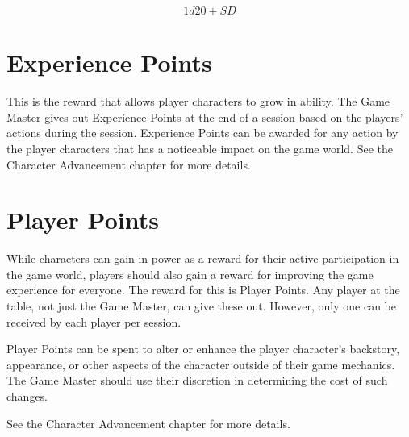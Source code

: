 \begin{multicols}{2}
$$1d20 + SD$$

\section{Experience Points}

This is the reward that allows player characters to grow in ability. The Game Master gives
out Experience Points at the end of a session based on the players' actions during the
session. Experience Points can be awarded for any action by the player characters that
has a noticeable impact on the game world. See the Character Advancement chapter for
more details.

\section{Player Points}

While characters can gain in power as a reward for their active participation in the game
world, players should also gain a reward for improving the game experience for everyone.
The reward for this is Player Points. Any player at the table, not just the Game Master,
can give these out. However, only one can be received by each player per session.

Player Points can be spent to alter or enhance the player character's backstory, appearance,
or other aspects of the character outside of their game mechanics. The Game Master should
use their discretion in determining the cost of such changes.

See the Character Advancement chapter for more details.

\end{multicols}
